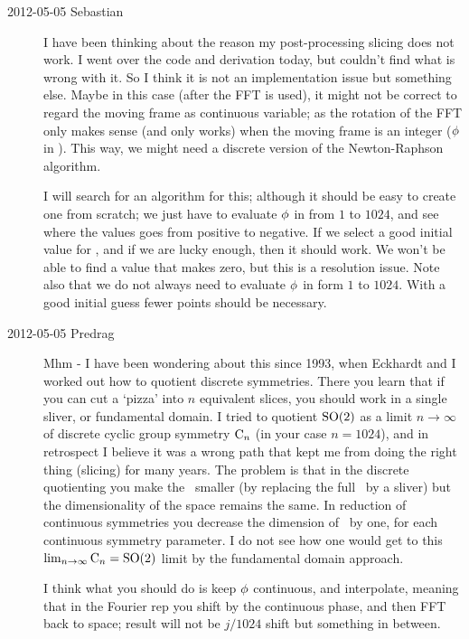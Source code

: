 \begin{description}
\item[2012-05-05 Sebastian]
I have been thinking about the reason my post-processing slicing does not
work. I went over the code and derivation today, but couldn't find what
is wrong with it.
So I think it is not an implementation issue but something else.  Maybe
in this case (after the FFT is used), it might not be correct to regard
the moving frame as continuous variable; as the rotation of the FFT
only makes sense (and only works) when the moving frame is an integer
(${\bf \phi}$ in ). This way, we might need a discrete version
of the Newton-Raphson algorithm.

I will search for an algorithm for this; although it should be easy to
create one from scratch; we just have to evaluate ${\bf \phi}$ in
 from $1$ to $1024$, and see where the values goes from
positive to negative. If we select a good initial value for ,
and if we are lucky enough, then it should work. We won't be able to find
a value that makes  zero, but this is a resolution issue.
Note also that we do not always need to evaluate ${\bf \phi}$ in
 form $1$ to $1024$. With a good initial guess fewer points
should be necessary.

\item[2012-05-05 Predrag]                                   \toCB
Mhm - I have been wondering about this since 1993, when Eckhardt and
I worked out how to
 {quotient discrete
symmetries}. There you learn that if you can cut a `pizza' into $n$
equivalent slices, you should work in a single sliver, or fundamental
domain. I tried to quotient $\textrm{SO}(2)$ as a limit $ n \to \infty$ of
discrete cyclic group symmetry $\textrm{C}_{n}$ (in your case $n=1024$), and in
retrospect I believe it was a wrong path that kept me from doing the
right thing (slicing) for many years. The problem is that in the discrete
quotienting you make the \reducedsp\ smaller (by replacing the full
\statesp\ by a sliver) but the dimensionality of the space remains the
same. In reduction of continuous symmetries you decrease the dimension of
\statesp\ by one, for each continuous symmetry parameter. I do not see how
one would get to this $\lim_{n \to \infty} \textrm{C}_{n} = \textrm{SO}(2)$ limit by
the fundamental domain approach.

I think what you should do is keep ${\bf \phi}$ continuous, and interpolate,
meaning that in the Fourier rep you shift by the continuous phase, and
then FFT back to space; result will not be $j/1024$ shift but something
in between.


\end{description}
